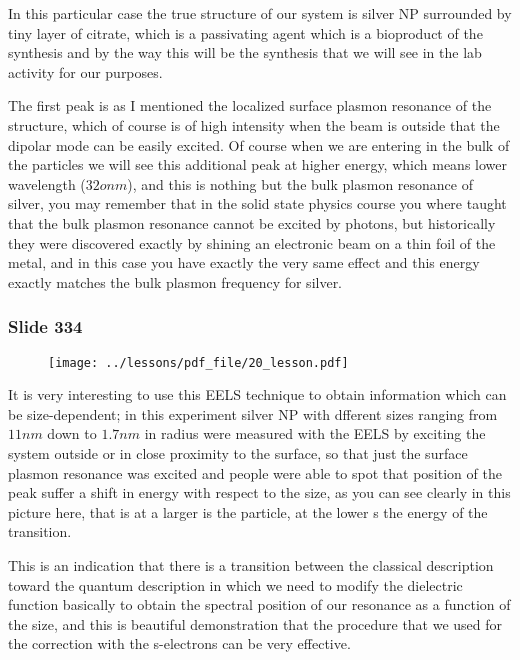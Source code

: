 \documentclass[../main/main.tex]{subfiles}
\begin{document}
In this particular case the true structure of our system is silver NP surrounded by tiny layer of citrate, which is a passivating agent which is a bioproduct of the synthesis and by the way this will be the synthesis that we will see in the lab activity for our purposes.

The first peak is as I mentioned the localized surface plasmon resonance of the structure, which of course is of high intensity when the beam is outside that the dipolar mode can be easily excited. Of course when we are entering in the bulk of the particles we will see this additional peak at higher energy, which means lower wavelength ($32o nm$), and this is nothing but the bulk plasmon resonance of silver, you may remember that in the solid state physics course you where taught that the bulk plasmon resonance cannot be excited by photons, but historically they were discovered exactly by shining an electronic beam on a thin foil of the metal, and in this case you have exactly the very same effect and this energy exactly matches the bulk plasmon frequency for silver. 

\newpage

\subsubsection{Slide 334}

\begin{figure}[h!]
\centering
\texttt{[image: ../lessons/pdf\_file/20\_lesson.pdf]}
\end{figure}

It is very interesting to use this EELS technique to obtain information which can be size-dependent; in this experiment silver NP with dfferent sizes ranging from $11 nm$ down to $1.7 nm$ in radius were measured with the EELS by exciting the system outside or in close proximity to the surface, so that just the surface plasmon resonance was excited and people were able to spot that position of the peak suffer a shift in energy with respect to the size, as you can see clearly in this picture here, that is at a larger is the particle, at the lower s the energy of the transition. 

This is an indication that there is a transition between the classical description toward the quantum description in which we need to modify the dielectric function basically to obtain the spectral position of our resonance as a function of the size, and this is beautiful demonstration that the procedure that we used for the correction with the s-electrons can be very effective.
\end{document}
